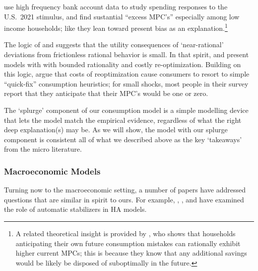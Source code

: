 \documentclass[\econtexRoot/HAFiscal]{subfiles}
\begin{document}
\cite{indarte2024explains} use high frequency bank account data to study spending responses to the U.S.\ 2021 stimulus, and find sustantial ``excess MPC's'' especially among low income households; like \cite{lmmPresentBias} they lean toward present bias as an explanation.\footnote{A related theoretical insight is provided by \citet{Lian2023-ca}, who shows that households anticipating their own future consumption mistakes can rationally exhibit higher current MPCs; this is because they know that any additional savings would be likely be disposed of suboptimally in the future.}

The logic of \cite{akerlof1985near} and \cite{cochrane1989sensitivity} suggests that the utility consequences of `near-rational' deviations from frictionless rational behavior is small.
In that spirit, \cite{BoutrosWindfall} and \cite{ilutEconomic} present models with with bounded rationality and costly re-optimization.  Building on this logic, \cite{ansQuickfix} argue that costs of reoptimization cause consumers to resort to simple ``quick-fix'' consumption heuristics; for small shocks, most people in their survey report that they anticipate that their MPC's would be one or zero.

The `splurge' component of our consumption model is a simple modelling device that lets the model match the empirical evidence, regardless of what the right deep explanation(s) may be. As we will show, the model with our splurge component is consistent all of what we described above as the key `takeaways' from the micro literature. 

\hypertarget{macroeconomic-models}{}
\subsubsection{Macroeconomic Models}
Turning now to the macroeconomic setting, a number of papers have addressed questions that are similar in spirit to ours.  For example, \cite{mckay2016role}, \cite{mckay2021optimal}, and \cite{phan2024welfare} have examined the role of automatic stabilizers in HA models.
\end{document}
